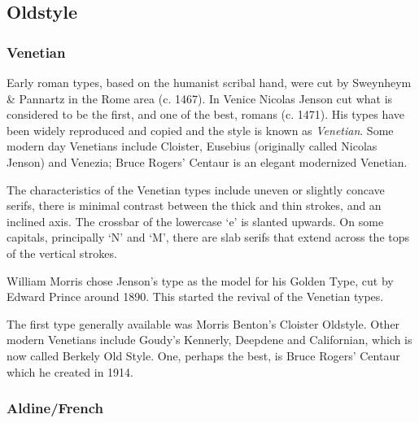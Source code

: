 \documentclass[10pt,a4paper,extrafontsizes]{memoir}
\begin{document}
\subsection{Oldstyle}

\subsubsection{Venetian}

\begin{paracol}{2}
\switchEng
    Early roman types, based on the humanist scribal hand, were cut by 
Sweynheym \& Pannartz in the Rome area (c. 1467). In Venice Nicolas
Jenson cut what is considered to be the first, 
and one of the best, romans
(c. 1471). His types have been widely reproduced and copied and the style
is known as \emph{Venetian}. Some modern day Venetians
include Cloister, Eusebius (originally
called Nicolas Jenson) and  Venezia; 
Bruce Rogers' Centaur is an elegant 
modernized Venetian.

    The characteristics of the Venetian types include uneven or slightly
concave serifs, there is minimal contrast between the thick and thin 
strokes, and an inclined axis. The crossbar of the lowercase `e' is slanted 
upwards. On some
capitals, principally `N' and `M', there are slab serifs that extend
across the tops of the vertical strokes.
  
    William Morris chose Jenson's 
type as the model
for his Golden Type, cut by Edward 
Prince around 1890. This started the revival of the
Venetian types. 

    The first type generally available was Morris Benton's
Cloister Oldstyle. Other modern Venetians include 
Goudy's Kennerly, 
Deepdene and Californian, which is now
called Berkely Old Style. One, perhaps the best,
is Bruce Rogers' Centaur which he created
in 1914.
\end{paracol}


\subsubsection{Aldine/French}
\end{document}
